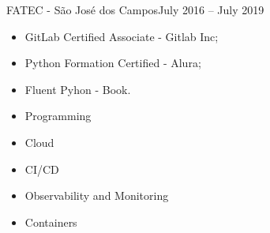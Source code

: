 
 {FATEC - São José dos Campos}{July 2016 -- July 2019}{}

\divider


\divider


\divider

\begin{itemize}
    \item GitLab Certified Associate - Gitlab Inc;
    \item Python Formation Certified - Alura;
    \item Fluent Pyhon - Book.
\end{itemize}



\begin{itemize}
    \item Programming
\end{itemize}


\divider

\begin{itemize}
    \item Cloud
\end{itemize}


\divider

\begin{itemize}
    \item CI/CD
\end{itemize}


\divider

\begin{itemize}
    \item Observability and Monitoring
\end{itemize}


\divider

\begin{itemize}
    \item Containers
\end{itemize}

